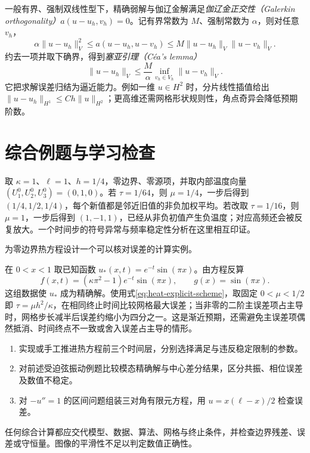 一般有界、强制双线性型下，精确弱解与伽辽金解满足\emph{伽辽金正交性（Galerkin orthogonality）}$a(u-u_h,v_h)=0$。记有界常数为 $M$、强制常数为 $\alpha$，则对任意 $v_h$，
\[
 \alpha\|u-u_h\|_V^2\le a(u-u_h,u-v_h)
 \le M\|u-u_h\|_V\|u-v_h\|_V.
\]
约去一项并取下确界，得到\emph{塞亚引理（C\'ea's lemma）}
\begin{equation}
 \|u-u_h\|_V\le\frac M\alpha\inf_{v_h\in V_h}\|u-v_h\|_V.
 \label{eq:cea}
\end{equation}
它把求解误差归结为逼近能力。例如一维 $u\in H^2$ 时，分片线性插值给出 $\|u-u_h\|_{H^1}\le Ch\|u\|_{H^2}$；更高维还需网格形状规则性，角点奇异会降低预期阶数。

\section{综合例题与学习检查}
\begin{example}[手算显式热格式的一步]
取 $\kappa=1$、$\ell=1$、$h=1/4$，零边界、零源项，并取内部温度向量 $(U_1^0,U_2^0,U_3^0)=(0,1,0)$。若 $\tau=1/64$，则 $\mu=1/4$，一步后得到 $(1/4,1/2,1/4)$，每个新值都是邻近旧值的非负加权平均。若改取 $\tau=1/16$，则 $\mu=1$，一步后得到 $(1,-1,1)$，已经从非负初值产生负温度；对应高频还会被反复放大。一个时间步的符号异常与频率稳定性分析在这里相互印证。
\end{example}

\begin{example}
为零边界热方程设计一个可以核对误差的计算实例。
\end{example}
\begin{solve}
在 $0<x<1$ 取已知函数 $u_*(x,t)=e^{-t}\sin(\pi x)$。由方程反算
\[
 f(x,t)=(\kappa\pi^2-1)e^{-t}\sin(\pi x),\qquad g(x)=\sin(\pi x).
\]
这组数据使 $u_*$ 成为精确解。使用式\eqref{eq:heat-explicit-scheme}，取固定 $0<\mu<1/2$ 即 $\tau=\mu h^2/\kappa$，在相同终止时间比较网格最大误差；当非零的二阶主误差项占主导时，网格步长减半后误差约缩小为四分之一。这是渐近预期，还需避免主误差项偶然抵消、时间终点不一致或舍入误差占主导的情形。
\end{solve}
\begin{enumerate}
 \item 实现或手工推进热方程前三个时间层，分别选择满足与违反稳定限制的参数。
 \item 对前述受迫弦振动例题比较模态精确解与中心差分结果，区分共振、相位误差及数值不稳定。
 \item 对 $-u''=1$ 的区间问题组装三对角有限元方程，用 $u=x(\ell-x)/2$ 检查误差。
\end{enumerate}
任何综合计算都应交代模型、数据、算法、网格与终止条件，并检查边界残差、误差或守恒量。图像的平滑性不足以判定数值正确性。

